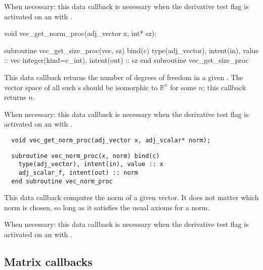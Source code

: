 When necessary: this data callback is necessary when the derivative test flag
is activated on an  with .
\begin{framed}
\vspace{-0.7cm}
\begin{ccode}
  void vec_get_norm_proc(adj_vector x, int* sz);
\end{ccode}
\vspace{-1.0cm}
\begin{fortrancode}
  subroutine vec_get_size_proc(vec, sz) bind(c)
    type(adj_vector), intent(in), value :: vec
    integer(kind=c_int), intent(out) :: sz
  end subroutine vec_get_size_proc
\end{fortrancode}
\vspace{-0.5cm}
\end{framed}
This data callback returns the number of degrees of freedom in a given . The
vector space of all such s should be isomorphic to $\mathbb{R}^n$ for some $n$;
this callback returns $n$.

When necessary: this data callback is necessary when the derivative test flag
is activated on an  with .
\begin{framed}
\vspace{-0.7cm}
\begin{verbatim}
  void vec_get_norm_proc(adj_vector x, adj_scalar* norm);
\end{verbatim}
\vspace{-1.0cm}
\begin{verbatim}
  subroutine vec_norm_proc(x, norm) bind(c)
    type(adj_vector), intent(in), value :: x
    adj_scalar_f, intent(out) :: norm
  end subroutine vec_norm_proc
\end{verbatim}
\vspace{-0.5cm}
\end{framed}
This data callback computes the norm of a given vector. It does not matter
which norm is chosen, so long as it satisfies the usual axioms for a norm.

When necessary: this data callback is necessary when the derivative test flag
is activated on an  with .
\subsection{Matrix callbacks}
